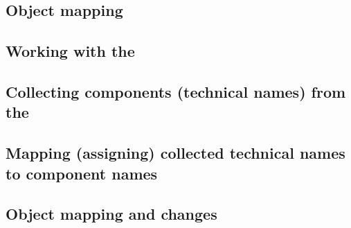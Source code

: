 \subsection{Object mapping}
\label{objectmappingtasks}


\subsection{Working with the \gdomeditor{}}
\label{TasksObjectMappingEditor}


\subsection{Collecting components (technical names) from the \gdaut{}}
\label{TasksOMCollect}


\subsection{Mapping (assigning) collected technical names to component names}
\label{TasksOMMap}


\subsection{Object mapping and \gdaut{} changes}

